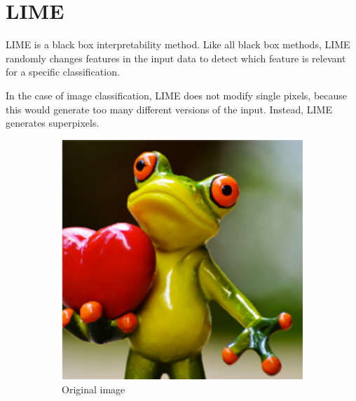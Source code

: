 \section{LIME}

LIME \cite{ribeiro2016should} is a black box interpretability method. Like all black box methods, LIME randomly changes features in the input data to detect which feature is relevant for a specific classification.

In the case of image classification, LIME does not modify single pixels, because this would generate too many different versions of the input.
Instead, LIME generates superpixels.

\begin{figure}[H]
    \centering
    \begin{subfigure}[t]{.35\textwidth}
        \centering
        \includegraphics[width=\linewidth]{chapters/02_methods/images/frog1.png}
        \caption{Original image}
    \end{subfigure}\hspace{1.5cm}%
    \begin{subfigure}[t]{.35\textwidth}
        \centering

\end{subfigure}
\end{figure}
